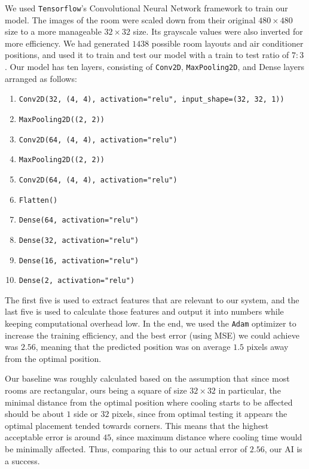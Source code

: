 We used \texttt{Tensorflow}'s Convolutional Neural Network framework to train our model. The images of the room were scaled down from their original $480\times 480$ size to a more manageable $32\times 32$ size. Its grayscale values were also inverted for more efficiency. We had generated $1438$ possible room layouts and air conditioner positions, and used it to train and test our model with a train to test ratio of $7:3$. Our model has ten layers, consisting of \texttt{Conv2D}, \texttt{MaxPooling2D}, and Dense layers arranged as follows:
\begin{enumerate}
    \item \texttt{Conv2D(32, (4, 4), activation="relu", input\_shape=(32, 32, 1))}
    \item \texttt{MaxPooling2D((2, 2))}
    \item \texttt{Conv2D(64, (4, 4), activation="relu")}
    \item \texttt{MaxPooling2D((2, 2))}
    \item \texttt{Conv2D(64, (4, 4), activation="relu")}
    \item \texttt{Flatten()}
    \item \texttt{Dense(64, activation="relu")}
    \item \texttt{Dense(32, activation="relu")}
    \item \texttt{Dense(16, activation="relu")}
    \item \texttt{Dense(2, activation="relu")}
\end{enumerate}
The first five is used to extract features that are relevant to our system, and the last five is used to calculate those features and output it into numbers while keeping computational overhead low. In the end, we used the \texttt{Adam} optimizer to increase the training efficiency, and the best error (using MSE) we could achieve was $2.56$, meaning that the predicted position was on average $1.5$ pixels away from the optimal position. 

Our baseline was roughly calculated based on the assumption that since most rooms are rectangular, ours being a square of size $32\times 32$ in particular, the minimal distance from the optimal position where cooling starts to be affected should be about $1$ side or $32$ pixels, since from optimal testing it appears the optimal placement tended towards corners. This means that the highest acceptable error is around $45$, since maximum distance where cooling time would be minimally affected. Thus, comparing this to our actual error of $2.56$, our AI is a success.

